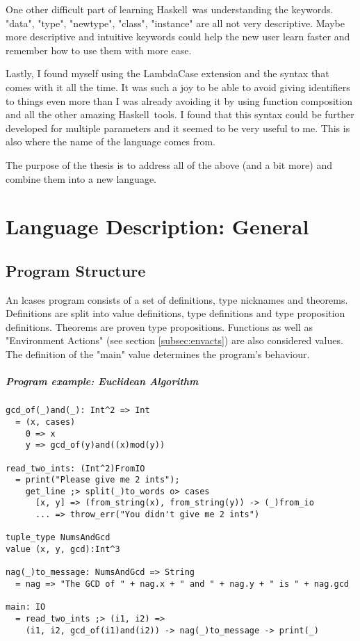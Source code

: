 \documentclass[diploma]{softlab-thesis}
\def\H{Haskell}
\begin{document}
One other difficult part of learning \H\ was understanding the keywords.
"data", "type", "newtype", "class", "instance" are all not very descriptive.
Maybe more descriptive and intuitive keywords could help the new user learn
faster and remember how to use them with more ease.

Lastly, I found myself using the LambdaCase extension and the syntax that comes
with it all the time. It was such a joy to be able to avoid giving identifiers
to things even more than I was already avoiding it by using function
composition and all the other amazing \H\ tools. I found that this syntax
could be further developed for multiple parameters and it seemed to be very
useful to me. This is also where the name of the language comes from.

The purpose of the thesis is to address all of the above (and a bit more) and
combine them into a new language.

\chapter{Language Description: General}

\section{Program Structure}

An lcases program consists of a set of definitions, type nicknames and
theorems.  Definitions are split into value definitions, type definitions and
type proposition definitions. Theorems are proven type propositions. Functions
as well as "Environment Actions" (see section \ref{subsec:envacts}) are also
considered values. The definition of the "main" value determines the program's
behaviour.

\paragraph{Program example: Euclidean Algorithm}
\begin{verbatim}
gcd_of(_)and(_): Int^2 => Int
  = (x, cases)
    0 => x
    y => gcd_of(y)and((x)mod(y))

read_two_ints: (Int^2)FromIO
  = print("Please give me 2 ints");
    get_line ;> split(_)to_words o> cases
      [x, y] => (from_string(x), from_string(y)) -> (_)from_io
      ... => throw_err("You didn't give me 2 ints")

tuple_type NumsAndGcd
value (x, y, gcd):Int^3

nag(_)to_message: NumsAndGcd => String
  = nag => "The GCD of " + nag.x + " and " + nag.y + " is " + nag.gcd

main: IO
  = read_two_ints ;> (i1, i2) =>
    (i1, i2, gcd_of(i1)and(i2)) -> nag(_)to_message -> print(_)
\end{verbatim}
\end{document}
